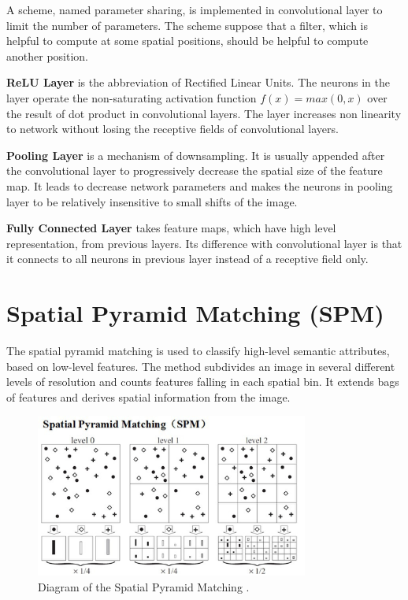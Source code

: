 A scheme, named parameter sharing, is implemented in convolutional layer to limit the number of parameters. The scheme suppose that a filter, which is helpful to compute at some spatial positions, should be helpful to compute another position.

\textbf{ReLU Layer} is the abbreviation of Rectified Linear Units. The neurons in the layer operate the non-saturating activation function $f(x) = max(0,x)$ over the result of dot product in convolutional layers. The layer increases non linearity to network without losing the receptive fields of convolutional layers.

\textbf{Pooling Layer} is a mechanism of downsampling. It is usually appended after the convolutional layer to progressively decrease the spatial size of the feature map. It leads to decrease network parameters and makes the neurons in pooling layer to be relatively insensitive to small shifts of the image.

\textbf{Fully Connected Layer} takes feature maps, which have high level representation, from previous layers. Its difference with convolutional layer is that it connects to all neurons in previous layer instead of a receptive field only.

\section{Spatial Pyramid Matching (SPM)}

The spatial pyramid matching \citep{lazebnik2006beyond} is used to classify high-level semantic attributes, based on low-level features. The method subdivides an image in several different levels of resolution and counts features falling in each spatial bin. It extends bags of features and derives spatial information from the image.
\graphicspath{ {./Figures/} }
\begin{figure}[!htb]
\centering
\includegraphics[width=0.8\textwidth]{spm.jpg}
\caption{\label{fig:SpatialPyramidMatching}Diagram of the Spatial Pyramid Matching \citep{lazebnik2006beyond}.}
\end{figure}


